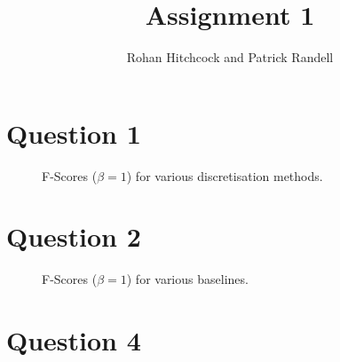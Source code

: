 \documentclass[11pt]{article}
\begin{document}
    \title{\textbf{Assignment 1}}
    \author{Rohan Hitchcock and Patrick Randell}
    \date{}
    \maketitle

    \section*{Question 1}
    \begin{figure}[H]
        \centering
        \def\svgwidth{\columnwidth}
        \fbox{\scalebox{0.5}{}}
        \caption{F-Scores ($\beta = 1$) for various discretisation methods.}
        \label{fig:q1-discretised-fscores}
    \end{figure}

    \section*{Question 2}
    \begin{figure}[H]
        \centering
        \def\svgwidth{\columnwidth}
        \fbox{\scalebox{0.5}{}}
        \caption{F-Scores ($\beta = 1$) for various baselines.}
        \label{fig:q2-baseline-fscores}
    \end{figure}

    \section*{Question 4}
\end{document}
